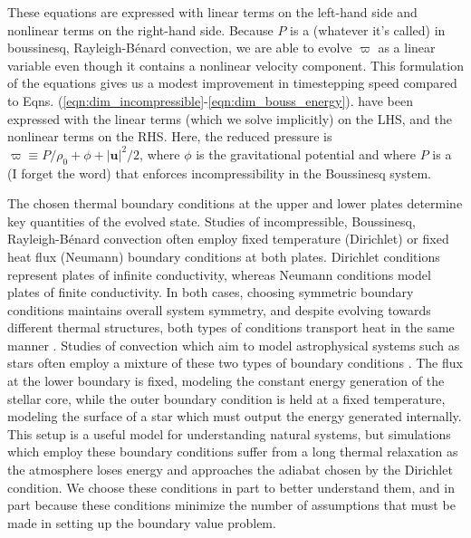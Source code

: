 \documentclass[aps, pre, onecolumn, nofootinbib, notitlepage, groupedaddress, amsfonts, amssymb, amsmath, longbibliography]{revtex4-1}
\newcommand{\RB}{Rayleigh-B\'{e}nard }
\begin{document}
These equations are expressed with linear terms on the left-hand side and
nonlinear terms on the right-hand side.  Because $P$ is a (whatever it's called) in boussinesq, \RB convection, we are able to
evolve $\varpi$ as a linear variable even though it contains a nonlinear velocity component.  This formulation
of the equations gives us a modest improvement in timestepping speed compared to Eqns. (\ref{eqn:dim_incompressible}-\ref{eqn:dim_bouss_energy}).
have been expressed with the linear terms (which we solve implicitly) on the LHS, and the
nonlinear terms on the RHS. Here, the reduced pressure is $\varpi \equiv P / \rho_0 + \phi + |\bm{u}|^2 / 2$,
where $\phi$ is the gravitational potential and where $P$ is a (I forget the word) that enforces incompressibility
in the Boussinesq system.

The chosen thermal boundary conditions at the upper and lower plates
determine key quantities of the evolved state.
Studies of incompressible, Boussinesq, \RB convection often
employ fixed temperature (Dirichlet) or fixed heat flux
(Neumann) boundary conditions at both plates.  
Dirichlet conditions represent plates of infinite conductivity,
whereas Neumann conditions model plates of finite conductivity.  
In both cases, choosing symmetric boundary conditions maintains overall system symmetry, 
and despite evolving towards different thermal structures, both types of conditions
transport heat in the same manner \cite{johnston&doering2009}.
Studies of convection which aim to model
astrophysical systems such as stars often employ a mixture of these
two types of boundary conditions \cite{hurlburt&all1984, cattaneo&all1991, korre&all2017}.  
The flux at the lower boundary is fixed, modeling
the constant energy generation of the stellar core, 
while the outer boundary condition is held at a fixed temperature,
modeling the surface of a star which must output the energy generated internally.
This setup is a useful model for understanding natural
systems, but simulations which employ these boundary conditions suffer from a long 
thermal relaxation as the atmosphere loses energy and approaches the adiabat chosen by the
Dirichlet condition.  We choose these conditions in part to better understand them, and in
part because these conditions minimize the number of assumptions that must be made in
setting up the boundary value problem.
\end{document}
